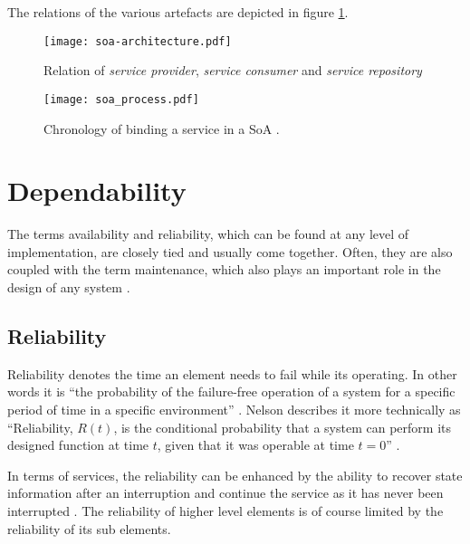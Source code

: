 The relations of the various artefacts are depicted in figure \ref{fig:soa_overview}.

\begin{figure}[!htbp]
\centering
\texttt{[image: soa-architecture.pdf]}
\caption{Relation of \emph{service provider}, \emph{service consumer} and \emph{service repository} \cite{arrowhead} \cite{converge}}
\label{fig:soa_overview}
\end{figure}

\begin{figure}[!htbp]
\centering
\texttt{[image: soa\_process.pdf]}
\caption{Chronology of binding a service in a SoA \cite{converge}.}
\label{fig:service_cronology}
\end{figure}











\section{Dependability}

The terms availability and reliability, which can be found at any level of implementation, are closely tied and usually come together. Often, they are also coupled with the term maintenance, which also plays an important role in the design of any system \cite[p.116]{genesys} \cite{lessner}.

\subsection{Reliability}
\label{sec:reliability}

Reliability denotes the time an element needs to fail while its operating. In other words it is ``the probability of the failure-free operation of a system for a specific period of time in a specific environment'' \cite[p.116]{genesys}. Nelson describes it more technically as ``Reliability, $R(t)$, is the conditional probability that a system can perform its designed function at time $t$, given that it was operable at time $t=0$'' \cite{nelson}.

In terms of services, the reliability can be enhanced by the ability to recover state information after an interruption and continue the service as it has never been interrupted \cite{genesys}. The reliability of higher level elements is of course limited by the reliability of its sub elements.


